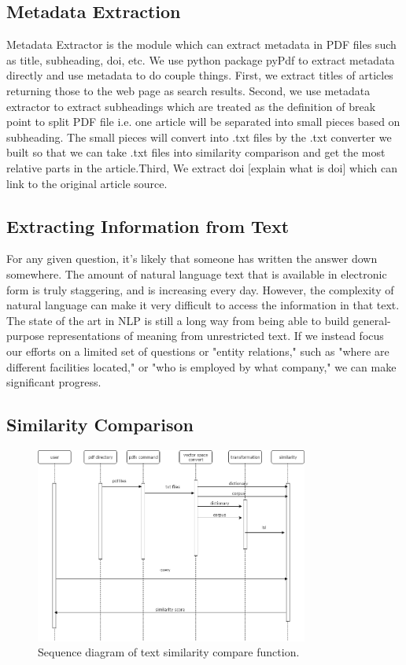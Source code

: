 \subsection{Metadata Extraction}
Metadata Extractor is the module which can extract metadata in PDF files such as title, subheading, doi, etc. We use python package pyPdf to extract metadata directly and use metadata to do couple things. First, we extract titles of articles returning those to the web page as search results. Second, we use metadata extractor to extract subheadings which are treated as the definition of break point to split PDF file i.e. one article will be separated into small pieces based on subheading. The small pieces will convert into .txt files by the .txt converter we built so that we can take .txt files into similarity comparison and get the most relative parts in the article.Third, We extract doi [explain what is doi] which can link to the original article source. 
      \subsection{Extracting Information from Text}
For any given question, it's likely that someone has written the answer down somewhere. The amount of natural language text that is available in electronic form is truly staggering, and is increasing every day. 
However, the complexity of natural language can make it very difficult to access the information in that text. The state of the art in NLP is still a long way from being able to build general-purpose representations of meaning from unrestricted text. 
If we instead focus our efforts on a limited set of questions or "entity relations," such as "where are different facilities located," or "who is employed by what company," we can make significant progress.
\subsection{Similarity Comparison}
	\begin{figure}[htb]
		\begin{center}
			\includegraphics[width=0.8\textwidth]{Rainy_Sequence_diagram}
		\end{center}
		\caption{Sequence diagram of text similarity compare function.\label{Sequence diagram}}
	\end{figure}
	\newpage